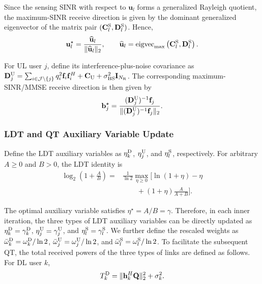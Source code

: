 \documentclass[letterpaper,journal]{IEEEtran}
\begin{document}
Since the sensing SINR with respect to $\mathbf u_l$ forms a generalized Rayleigh quotient, the maximum-SINR receive direction is given by the dominant generalized eigenvector of the matrix pair $(\mathbf C_l^{\rm S},\mathbf D_l^{\rm S})$. Hence,
\begin{equation}
\mathbf u_l^\star
=
\frac{\widehat{\mathbf u}_l}{\|\widehat{\mathbf u}_l\|_2},
\qquad
\widehat{\mathbf u}_l
=
\operatorname{eigvec}_{\max}
\left(
\mathbf C_l^{\rm S},
\mathbf D_l^{\rm S}
\right).
\label{eq:sensing_rx_update}
\end{equation}

For UL user $j$, define its interference-plus-noise covariance as $\mathbf D_j^{\rm U}=\sum_{i\in\mathcal J\setminus\{j\}}q_i^2\mathbf f_i\mathbf f_i^H+\mathbf C_{\rm U}+\sigma_{\rm BS}^2\mathbf I_{N_{\rm R}}$. The corresponding maximum-SINR/MMSE receive direction is then given by
\begin{equation}
\mathbf b_j^\star
=
\frac{
(\mathbf D_j^{\rm U})^{-1}\mathbf f_j
}{
\|(\mathbf D_j^{\rm U})^{-1}\mathbf f_j\|_2
}.
\label{eq:ul_rx_update}
\end{equation}

\subsubsection{LDT and QT Auxiliary Variable Update}

Define the LDT auxiliary variables as $\eta_k^{\rm D}$, $\eta_j^{\rm U}$, and $\eta_l^{\rm S}$, respectively. For arbitrary $A\ge0$ and $B>0$, the LDT identity is
\begin{equation}
\begin{aligned}
\log_2\left(1+\frac{A}{B}\right)
={}&
\frac{1}{\ln 2}
\max_{\eta\ge0}
\Bigg[
\ln(1+\eta)-\eta
\\
&\qquad
+
(1+\eta)
\frac{A}{A+B}
\Bigg].
\end{aligned}
\label{eq:ldt_identity}
\end{equation}

The optimal auxiliary variable satisfies $\eta^\star=A/B=\gamma$. Therefore, in each inner iteration, the three types of LDT auxiliary variables can be directly updated as $\eta_k^{\rm D}=\gamma_k^{\rm D}$, $\eta_j^{\rm U}=\gamma_j^{\rm U}$, and $\eta_l^{\rm S}=\gamma_l^{\rm S}$. We further define the rescaled weights as $\bar\omega_k^{\rm D}=\omega_k^{\rm D}/\ln 2$, $\bar\omega_j^{\rm U}=\omega_j^{\rm U}/\ln 2$, and $\bar\omega_l^{\rm S}=\omega_l^{\rm S}/\ln 2$. To facilitate the subsequent QT, the total received powers of the three types of links are defined as follows. For DL user $k$,
\begin{equation}
T_k^{\rm D}
=
\|\mathbf h_k^H\mathbf Q\|_2^2+\sigma_k^2.
\label{eq:total_power_dl}
\end{equation}
\end{document}
